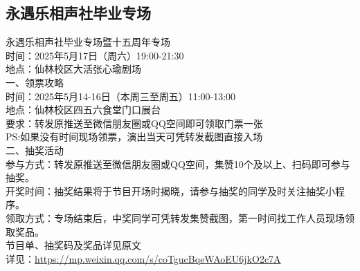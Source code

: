 \documentclass[letterpaper, 12pt]{article}
\begin{document}
\begin{multicols}{2}
\subsection{永遇乐相声社毕业专场} %
永遇乐相声社毕业专场暨十五周年专场
\\时间：2025年5月17日（周六）19:00-21:30
\\地点：仙林校区大活张心瑜剧场
\\一、领票攻略
\\时间：2025年5月14-16日（本周三至周五）11:00-13:00
\\地点：仙林校区四五六食堂门口展台
\\要求：转发原推送至微信朋友圈或QQ空间即可领取门票一张
\\PS:如果没有时间现场领票，演出当天可凭转发截图直接入场
\\二、抽奖活动
\\参与方式：转发原推送至微信朋友圈或QQ空间，集赞10个及以上、扫码即可参与抽奖。
\\开奖时间：抽奖结果将于节目开场时揭晓，请参与抽奖的同学及时关注抽奖小程序。
\\领取方式：专场结束后，中奖同学可凭转发集赞截图，第一时间找工作人员现场领取奖品。
\\节目单、抽奖码及奖品详见原文
\\详见：\url{https://mp.weixin.qq.com/s/coTgucBqeWAoEU6jkO2c7A}
\end{multicols}
\end{document}
